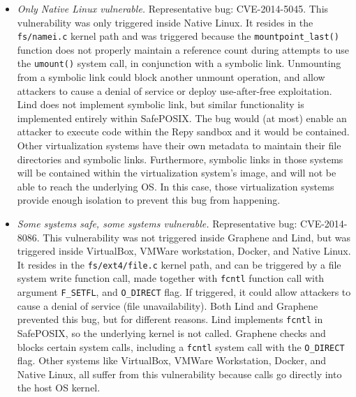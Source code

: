 {\begin{itemize}
\item \emph{Only Native Linux vulnerable.}  Representative bug: CVE-2014-5045.
This vulnerability was only triggered inside Native Linux. It resides in the
\texttt{fs/namei.c} kernel path and was triggered because
the \texttt{mountpoint\_last()}
function does not properly
maintain a reference count during attempts to use the \texttt{umount()} system call,
in conjunction with a symbolic link. Unmounting from a symbolic link could block
 another unmount operation, and allow attackers to cause a denial of service or
 deploy use-after-free exploitation. Lind does not implement symbolic link, but
 similar functionality is implemented entirely
within SafePOSIX.  The bug would (at most) enable an attacker to execute
code within the Repy sandbox and it would be contained.
Other virtualization systems have their own metadata to maintain their file
directories and symbolic links.
Furthermore, symbolic links in those systems will be contained within the virtualization system's image,
and will not be able to reach the underlying OS. In this case, those virtualization systems provide enough
isolation to prevent this bug from happening.

\item \emph{Some systems safe, some systems vulnerable.}  Representative bug: CVE-2014-8086.
This vulnerability was not triggered inside Graphene and Lind, but was triggered inside
VirtualBox, VMWare workstation, Docker, and Native Linux. It resides in
the \texttt{fs/ext4/file.c} kernel path, and can be triggered by a file system write
function call, made together with \texttt{fcntl} function call
with argument \texttt{F\_SETFL}, and \texttt{O\_DIRECT} flag. If triggered, it could
allow attackers to cause a denial of service (file unavailability). Both Lind and
Graphene prevented this bug, but for different reasons. Lind
implements \texttt{fcntl} in SafePOSIX, so the underlying kernel is not called.
Graphene checks and blocks certain system calls, including
a \texttt{fcntl} system call with the \texttt{O\_DIRECT} flag.
Other systems like VirtualBox, VMWare Workstation, Docker, and Native Linux,
all suffer from this vulnerability because calls go directly into the host OS
kernel.


\end{itemize}}
